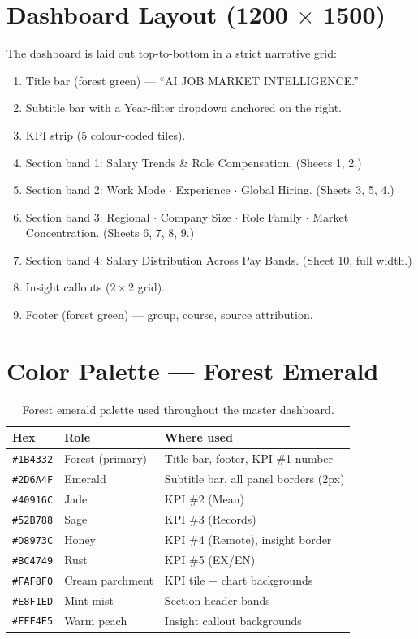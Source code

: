 \documentclass[11pt,a4paper,oneside]{report}
\begin{document}
\section{Dashboard Layout (1200 \(\times\) 1500)}
The dashboard is laid out top-to-bottom in a strict narrative grid:
\begin{enumerate}
    \item Title bar (forest green) --- ``AI JOB MARKET INTELLIGENCE.''
    \item Subtitle bar with a Year-filter dropdown anchored on the right.
    \item KPI strip (5 colour-coded tiles).
    \item Section band 1: Salary Trends \& Role Compensation. (Sheets 1, 2.)
    \item Section band 2: Work Mode $\cdot$ Experience $\cdot$ Global Hiring. (Sheets 3, 5, 4.)
    \item Section band 3: Regional $\cdot$ Company Size $\cdot$ Role Family $\cdot$ Market Concentration. (Sheets 6, 7, 8, 9.)
    \item Section band 4: Salary Distribution Across Pay Bands. (Sheet 10, full width.)
    \item Insight callouts ($2 \times 2$ grid).
    \item Footer (forest green) --- group, course, source attribution.
\end{enumerate}

\section{Color Palette --- Forest Emerald}
\begin{table}[H]
    \centering
    \begin{tabular}{lll}
        \toprule
        \textbf{Hex} & \textbf{Role} & \textbf{Where used} \\
        \midrule
        \texttt{\#1B4332} & Forest (primary) & Title bar, footer, KPI \#1 number \\
        \texttt{\#2D6A4F} & Emerald & Subtitle bar, all panel borders (2px) \\
        \texttt{\#40916C} & Jade & KPI \#2 (Mean) \\
        \texttt{\#52B788} & Sage & KPI \#3 (Records) \\
        \texttt{\#D8973C} & Honey & KPI \#4 (Remote), insight border \\
        \texttt{\#BC4749} & Rust & KPI \#5 (EX/EN) \\
        \texttt{\#FAF8F0} & Cream parchment & KPI tile + chart backgrounds \\
        \texttt{\#E8F1ED} & Mint mist & Section header bands \\
        \texttt{\#FFF4E5} & Warm peach & Insight callout backgrounds \\
        \bottomrule
    \end{tabular}
    \caption{Forest emerald palette used throughout the master dashboard.}
\end{table}
\end{document}
